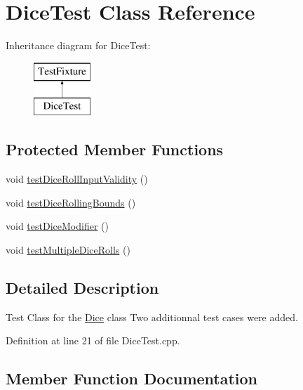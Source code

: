 \hypertarget{class_dice_test}{}\section{Dice\+Test Class Reference}
\label{class_dice_test}
Inheritance diagram for Dice\+Test\+:\begin{figure}[H]
\begin{center}
\leavevmode
\includegraphics[height=2.000000cm]{class_dice_test}
\end{center}
\end{figure}
\subsection*{Protected Member Functions}
\begin{DoxyCompactItemize}
\item 
void \hyperlink{class_dice_test_a3e9f2421e914d4f18de2327828345860}{test\+Dice\+Roll\+Input\+Validity} ()
\item 
void \hyperlink{class_dice_test_a365b7b1d1ffe9faac8f306de9944d173}{test\+Dice\+Rolling\+Bounds} ()
\item 
void \hyperlink{class_dice_test_acaed0b4e36c99495831d3ec8d0eeb456}{test\+Dice\+Modifier} ()
\item 
void \hyperlink{class_dice_test_a2938677150e8e96c7a80f8f5111dcf15}{test\+Multiple\+Dice\+Rolls} ()
\end{DoxyCompactItemize}


\subsection{Detailed Description}
Test Class for the \hyperlink{class_dice}{Dice} class Two additionnal test cases were added. 

Definition at line 21 of file Dice\+Test.\+cpp.



\subsection{Member Function Documentation}
\hypertarget{class_dice_test_acaed0b4e36c99495831d3ec8d0eeb456}{}
